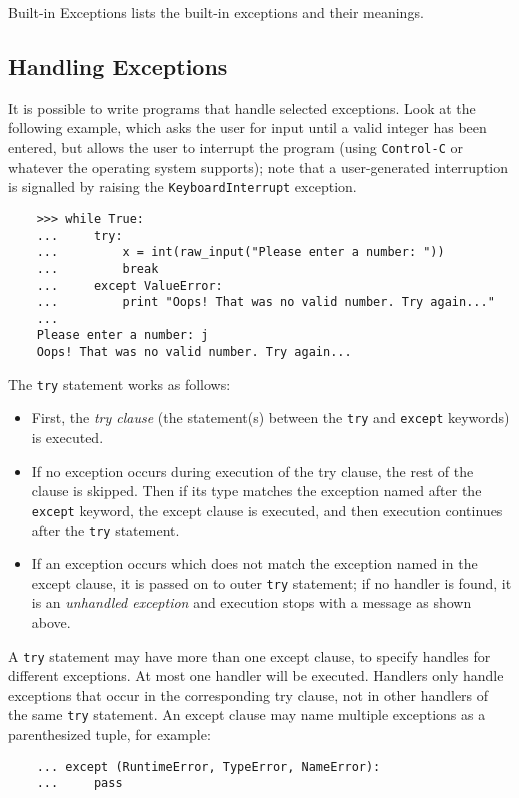 \documentclass[UTF8]{article}
\begin{document}
Built-in Exceptions lists the built-in exceptions and their meanings.

\subsection{Handling Exceptions}
It is possible to write programs that handle selected exceptions. Look at the following example,
which asks the user for input until a valid integer has been entered, but allows the user to
interrupt the program (using \texttt{Control-C} or whatever the operating system supports); note
that a user-generated interruption is signalled by raising the \texttt{KeyboardInterrupt} exception.
\begin{verbatim}
    >>> while True:
    ...     try:
    ...         x = int(raw_input("Please enter a number: "))
    ...         break
    ...     except ValueError:
    ...         print "Oops! That was no valid number. Try again..."
    ...
    Please enter a number: j
    Oops! That was no valid number. Try again...
\end{verbatim}

The \texttt{try} statement works as follows:
\begin{itemize}
     \item First, the \emph{try clause} (the statement(s) between the \texttt{try} and
     \texttt{except} keywords) is executed.
     \item If no exception occurs during execution of the try clause, the rest of the clause is
     skipped. Then if its type matches the exception named after the \texttt{except} keyword, the
     except clause is executed, and then execution continues after the \texttt{try} statement.
     \item If an exception occurs which does not match the exception named in the except clause, it
     is passed on to outer \texttt{try} statement; if no handler is found, it is an \emph{unhandled
     exception} and execution stops with a message as shown above.
\end{itemize}

A \texttt{try} statement may have more than one except clause, to specify handles for different
exceptions. At most one handler will be executed. Handlers only handle exceptions that occur in the
corresponding try clause, not in other handlers of the same \texttt{try} statement. An except
clause may name multiple exceptions as a parenthesized tuple, for example:
\begin{verbatim}
    ... except (RuntimeError, TypeError, NameError):
    ...     pass
\end{verbatim}
\end{document}
